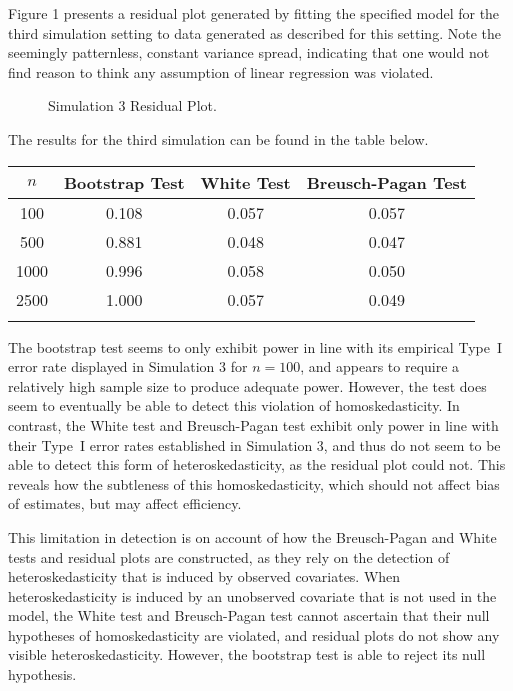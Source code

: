 \documentclass[12pt]{article} %
\theoremstyle{definition}
\begin{document}
Figure 1 presents a residual plot generated by fitting the specified model for the third simulation setting to data generated as described for this setting. Note the seemingly
patternless, constant variance spread, indicating that one would not find reason to think any assumption of linear regression was violated. 

\begin{figure}[H]
\centerline{}\par  %
\caption{Simulation 3 Residual Plot.}
\end{figure}

The results for the third simulation can be found in the table below.

\begin{table}[H]
	\centering
	\small\addtolength{\tabcolsep}{-3pt}
	\setlength\extrarowheight{-3pt}
	{
	\begin{tabular}{ c|c|c|c}
	$n$ & Bootstrap Test & White Test & Breusch-Pagan Test \\
	 \hline
	 100 & 0.108 & 0.057 & 0.057 \\
	 500 & 0.881 & 0.048 & 0.047 \\
	 1000 & 0.996 & 0.058 & 0.050 \\
	 2500 & 1.000 & 0.057 & 0.049 \\
	 \Xhline{3\arrayrulewidth}
	\end{tabular}
	}
\end{table}

The bootstrap test seems to only exhibit power in line with its empirical Type~I error rate displayed in Simulation 3 for $n = 100$, and appears to require a relatively high sample size to produce
adequate power. However, the test does seem to eventually be able to detect this violation of homoskedasticity. In contrast, the White test and Breusch-Pagan test exhibit only power in line with their Type~I error
rates established in Simulation 3, and thus do not seem to be able to detect this form of heteroskedasticity, as the residual plot could not. This reveals how the subtleness of this homoskedasticity,
which should not affect bias of estimates, but may affect efficiency.

This limitation in detection is on account of how the Breusch-Pagan and White tests and residual plots are constructed, as they rely on the detection of heteroskedasticity that is induced by observed covariates.
When heteroskedasticity is induced by an unobserved covariate that is not used in the model, the White test and Breusch-Pagan test cannot ascertain that their
null hypotheses of homoskedasticity are violated, and residual plots do not show any visible heteroskedasticity. However, the bootstrap test is able to reject its null hypothesis.
\end{document}
